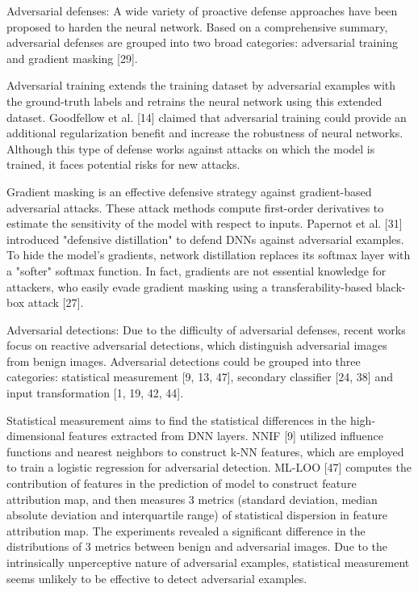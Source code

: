 \documentclass{article}
\begin{document}
Adversarial defenses: A wide variety of proactive defense approaches have been proposed to harden the neural network. Based on a comprehensive summary, adversarial defenses are grouped into two broad categories: adversarial training and gradient masking [29].

Adversarial training extends the training dataset by adversarial examples with the ground-truth labels and retrains the neural network using this extended dataset. Goodfellow et al. [14] claimed that adversarial training could provide an additional regularization benefit and increase the robustness of neural networks. Although this type of defense works against attacks on which the model is trained, it faces potential risks for new attacks.

Gradient masking is an effective defensive strategy against gradient-based adversarial attacks. These attack methods compute first-order derivatives to estimate the sensitivity of the model with respect to inputs. Papernot et al. [31] introduced "defensive distillation" to defend DNNs against adversarial examples. To hide the model's gradients, network distillation replaces its softmax layer with a "softer" softmax function. In fact, gradients are not essential knowledge for attackers, who easily evade gradient masking using a transferability-based black-box attack [27].

Adversarial detections: Due to the difficulty of adversarial defenses, recent works focus on reactive adversarial detections, which distinguish adversarial images from benign images. Adversarial detections could be grouped into three categories: statistical measurement [9, 13, 47], secondary classifier [24, 38] and input transformation [1, 19, 42, 44].

Statistical measurement aims to find the statistical differences in the high-dimensional features extracted from DNN layers. NNIF [9] utilized influence functions and nearest neighbors to construct k-NN features, which are employed to train a logistic regression for adversarial detection. ML-LOO [47] computes the contribution of features in the prediction of model to construct feature attribution map, and then measures 3 metrics (standard deviation, median absolute deviation and interquartile range) of statistical dispersion in feature attribution map. The experiments revealed a significant difference in the distributions of 3 metrics between benign and adversarial images. Due to the intrinsically unperceptive nature of adversarial examples, statistical measurement seems unlikely to be effective to detect adversarial examples.
\end{document}
